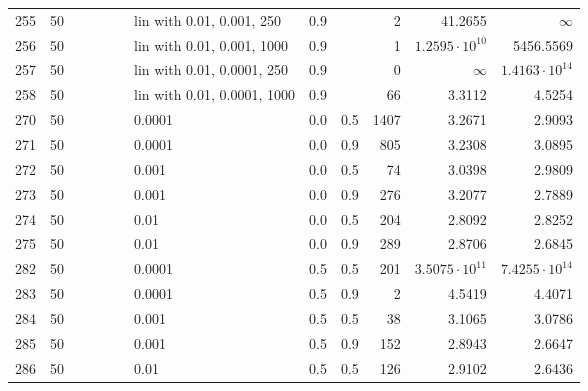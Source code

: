 \begin{longtable}{lrrrrrlrrrrr}
 255 &      50 &   &   &   &   &   lin with 0.01, 0.001, 250 &  0.9 &        &       2 &                41.2655 &               $\infty$ \\
 256 &      50 &   &   &   &   &  lin with 0.01, 0.001, 1000 &  0.9 &        &       1 &  $1.2595\cdot 10^{10}$ &              5456.5569 \\
 257 &      50 &   &   &   &   &  lin with 0.01, 0.0001, 250 &  0.9 &        &       0 &               $\infty$ &  $1.4163\cdot 10^{14}$ \\
 258 &      50 &   &   &   &   & lin with 0.01, 0.0001, 1000 &  0.9 &        &      66 &                 3.3112 &                 4.5254 \\
 270 &      50 &   &   &   &   &                      0.0001 &  0.0 &    0.5 &    1407 &                 3.2671 &                 2.9093 \\
 271 &      50 &   &   &   &   &                      0.0001 &  0.0 &    0.9 &     805 &                 3.2308 &                 3.0895 \\
 272 &      50 &   &   &   &   &                       0.001 &  0.0 &    0.5 &      74 &                 3.0398 &                 2.9809 \\
 273 &      50 &   &   &   &   &                       0.001 &  0.0 &    0.9 &     276 &                 3.2077 &                 2.7889 \\
 274 &      50 &   &   &   &   &                        0.01 &  0.0 &    0.5 &     204 &                 2.8092 &                 2.8252 \\
 275 &      50 &   &   &   &   &                        0.01 &  0.0 &    0.9 &     289 &                 2.8706 &                 2.6845 \\
 282 &      50 &   &   &   &   &                      0.0001 &  0.5 &    0.5 &     201 &  $3.5075\cdot 10^{11}$ &  $7.4255\cdot 10^{14}$ \\
 283 &      50 &   &   &   &   &                      0.0001 &  0.5 &    0.9 &       2 &                 4.5419 &                 4.4071 \\
 284 &      50 &   &   &   &   &                       0.001 &  0.5 &    0.5 &      38 &                 3.1065 &                 3.0786 \\
 285 &      50 &   &   &   &   &                       0.001 &  0.5 &    0.9 &     152 &                 2.8943 &                 2.6647 \\
 286 &      50 &   &   &   &   &                        0.01 &  0.5 &    0.5 &     126 &                 2.9102 &                 2.6436 \\

\end{longtable}
